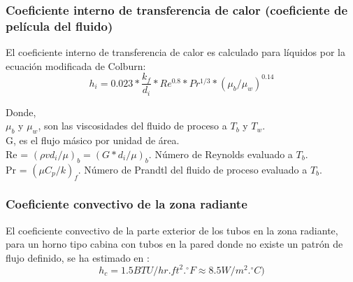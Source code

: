\subsubsection{Coeficiente interno de transferencia de calor (coeficiente de película del fluido)}
\par El coeficiente interno de transferencia de calor es calculado para líquidos por la ecuación modificada de Colburn:
\begin{equation}
\label{eq:hi}
 h_i = 0.023 * \frac{k_f}{d_i} *Re^{0.8} *Pr^{1/3} *(\mu_b /\mu_w )^{0.14}
\end{equation}
\par Donde,\\
$\mu_b$ y $\mu_w$, son las viscosidades del fluido de proceso a $T_b$ y $T_w$. \\
G, es el flujo másico por unidad de área. \\
Re = $(\rho v d_i / \mu)_b = (G *d_i / \mu)_b$. Número de Reynolds evaluado a $T_b$.\\
Pr = $(\mu C_p / k)_f$. Número de Prandtl del fluido de proceso evaluado a $T_b$.

\subsubsection{Coeficiente convectivo de la zona radiante}
\par El coeficiente convectivo de la parte exterior de los tubos en la zona radiante, para un horno tipo cabina con tubos en la pared donde no existe un patrón de flujo definido, se ha estimado en \cite{sirios}:
\begin{equation}
h_{c} = 1.5 BTU/hr.ft^2.^{\circ}F \approx 8.5 W/m^2.^{\circ}C)
\end{equation}


